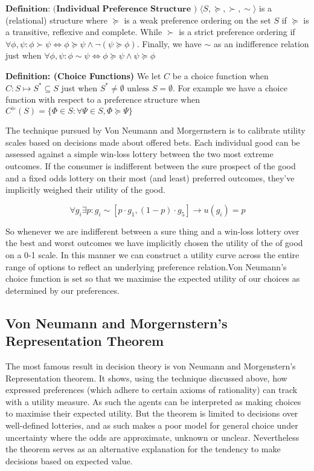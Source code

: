 \documentclass[
]{book}
\theoremstyle{definition}
\theoremstyle{definition}
\theoremstyle{definition}
\theoremstyle{remark}
\begin{document}
\(\textbf{Definition: (Individual Preference Structure )}\) \(\langle S, \succeq, \succ, \sim \rangle\) is a (relational) structure where \(\succeq\) is a weak preference ordering on the set \(S\) if \(\succeq\) is a transitive, reflexive and complete. While \(\succ\) is a strict preference ordering if \({\forall \phi, \psi : \phi \succ \psi \Leftrightarrow \phi \succeq \psi \wedge \neg(\psi \succeq \phi)}\). Finally, we have \(\sim\) as an indifference relation just when \({ \forall \phi, \psi : \phi \sim \psi \Leftrightarrow \phi \succeq \psi \wedge \psi \succeq \phi}\)
\linebreak

\textbf{Definition: (Choice Functions)} We let \textbf{$C$} be a choice function when \({C: S \mapsto S^{*} \subseteq S}\) just when \({S^{*} \neq \emptyset \text{ unless } S = \emptyset }\). For example we have a choice function with respect to a preference structure when \({C^{\succeq}(S) = \{ \Phi \in S : \forall \Psi \in S, \Phi \succeq \Psi \}}\)

The technique pursued by Von Neumann and Morgernstern is to calibrate utility scales based on decisions made about offered bets. Each individual good can be assessed against a simple win-loss lottery between the two most extreme outcomes. If the consumer is indifferent between the sure prospect of the good and a fixed odds lottery on their most (and least) preferred outcomes, they've implicitly weighed their utility of the good.

\[ \forall g_i \exists  p :  g _{i} \sim [p \cdot g_{1}, (1-p)\cdot g_{5}] \rightarrow u(g_{i}) = p \]

\noindent So whenever we are indifferent between a sure thing and a win-loss lottery over the best and worst outcomes we have implicitly chosen the utility of the of good on a 0-1 scale. In this manner we can construct a utility curve across the entire range of options to reflect an underlying preference relation.Von Neumann's choice function is set so that we maximise the expected utility of our choices as determined by our preferences.

\hypertarget{von-neumann-and-morgernsterns-representation-theorem}{%
\subsection{Von Neumann and Morgernstern's Representation Theorem}\label{von-neumann-and-morgernsterns-representation-theorem}}

The most famous result in decision theory is von Neumann and Morgenstern's Representation theorem. It shows, using the technique discussed above, how expressed preferences (which adhere to certain axioms of rationality) can track with a utility measure. As such the agents can be interpreted as making choices to maximise their expected utility. But the theorem is limited to decisions over well-defined lotteries, and as such makes a poor model for general choice under uncertainty where the odds are approximate, unknown or unclear. Nevertheless the theorem serves as an alternative explanation for the tendency to make decisions based on expected value.
\end{document}
